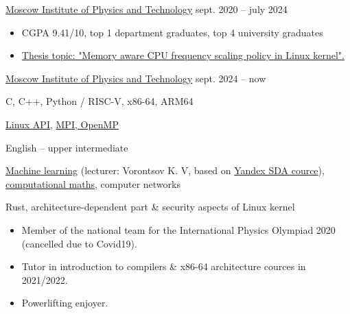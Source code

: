         {\href{https://mipt.ru}{Moscow Institute of Physics and Technology}}
        {sept. 2020 -- july 2024}{}

    \begin{itemize}
        \item CGPA 9.41/10, top 1 department graduates, top 4 university graduates
        \item \href{https://github.com/Vokerlee/macfm-governor-thesis}
                   {Thesis topic: "Memory aware CPU frequency scaling policy in Linux kernel".}
    \end{itemize}

        {\href{https://mipt.ru}{Moscow Institute of Physics and Technology}}
        {sept. 2024 -- now}{}


    C, C++, Python / RISC-V, x86-64, ARM64
    \smallskip

    \href{https://github.com/Vokerlee/linux-api-course}{Linux API},
    \href{https://github.com/Vokerlee/parallel-computing-mipt}{MPI, OpenMP}
    \smallskip

    English -- upper intermediate

    \href{https://github.com/Vokerlee/machine-learning-mipt}{Machine learning} (lecturer: Vorontsov K. V, based on
        \href{https://dataschool.yandex.com}{Yandex SDA cource}),
    \href{https://github.com/Vokerlee/computational-maths-mipt}{computational maths},
    computer networks
    \smallskip

    Rust, architecture-dependent part \& security aspects of Linux kernel
    \smallskip

    \begin{itemize}
        \item Member of the national team for the International Physics Olympiad 2020 (cancelled due to Covid19).
        \item Tutor in introduction to compilers \& x86-64 architecture cources in 2021/2022.
        \item Powerlifting enjoyer.
    \end{itemize}

